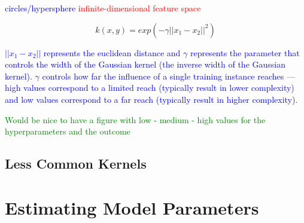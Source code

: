 \textcolor{blue}{circles/hypersphere}
\textcolor{red}{infinite-dimensional feature space}

\begin{equation}
{k(x, y) = exp(- \gamma || x_1 - x_2 || ^2 ) }
\label{eq:kernel_guassian_rbf_eq}
\end{equation}

\textcolor{blue}{$|| x_1 - x_2 ||$ represents the euclidean distance and $\gamma$ represents the parameter that controls the width of the Gaussian kernel (the inverse width of the Gaussian kernel). $\gamma$ controls how far the influence of a single training instance reaches --- high values correspond to a limited reach (typically result in lower complexity) and low values correspond to a far reach (typically result in higher complexity).}

\textcolor{green}{Would be nice to have a figure with low - medium - high values for the hyperparameters and the outcome}


\subsection{Less Common Kernels}










\section{Estimating Model Parameters}

